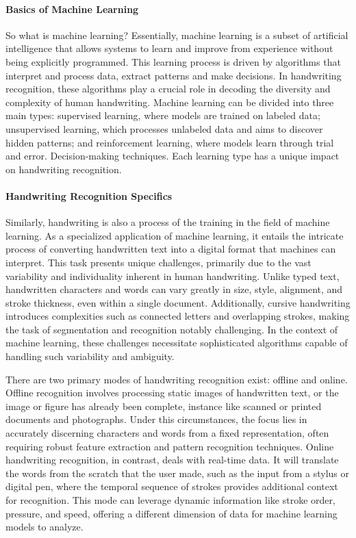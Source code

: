 \documentclass[12pt]{article}
\begin{document}
\paragraph{Basics of Machine Learning}
So what is machine learning? Essentially, machine learning is a subset of artificial intelligence that allows systems to learn and improve from experience without being explicitly programmed. This learning process is driven by algorithms that interpret and process data, extract patterns and make decisions. In handwriting recognition, these algorithms play a crucial role in decoding the diversity and complexity of human handwriting. Machine learning can be divided into three main types: supervised learning, where models are trained on labeled data; unsupervised learning, which processes unlabeled data and aims to discover hidden patterns; and reinforcement learning, where models learn through trial and error. Decision-making techniques. Each learning type has a unique impact on handwriting recognition.

\paragraph{Handwriting Recognition Specifics}
Similarly, handwriting is also a process of the training in the field of machine learning. As a specialized application of machine learning, it entails the intricate process of converting handwritten text into a digital format that machines can interpret. This task presents unique challenges, primarily due to the vast variability and individuality inherent in human handwriting. Unlike typed text, handwritten characters and words can vary greatly in size, style, alignment, and stroke thickness, even within a single document. Additionally, cursive handwriting introduces complexities such as connected letters and overlapping strokes, making the task of segmentation and recognition notably challenging. In the context of machine learning, these challenges necessitate sophisticated algorithms capable of handling such variability and ambiguity.

There are two primary modes of handwriting recognition exist: offline and online. Offline recognition involves processing static images of handwritten text, or the image or figure has already been complete, instance like scanned or printed documents and photographs. Under this circumstances, the focus lies in accurately discerning characters and words from a fixed representation, often requiring robust feature extraction and pattern recognition techniques. Online handwriting recognition, in contrast, deals with real-time data. It will translate the words from the scratch that the user made, such as the input from a stylus or digital pen, where the temporal sequence of strokes provides additional context for recognition. This mode can leverage dynamic information like stroke order, pressure, and speed, offering a different dimension of data for machine learning models to analyze.
\end{document}
